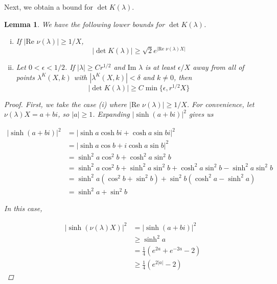 \documentclass[12pt]{article}
\newtheorem{lemma}{Lemma}
\begin{document}
Next, we obtain a bound for $\det K(\lambda)$. 


\begin{lemma}\label{detKlemma}
We have the following lower bounds for $\det K(\lambda)$.
\begin{enumerate}[(i)]
\item If $|\text{Re }\nu(\lambda)| \geq 1/X$, 
\begin{equation}\label{detKbound1}
|\det K(\lambda)| \geq \sqrt{2} e^{|\text{Re }\nu(\lambda)X|}
\end{equation}
\item Let $0 < \epsilon < 1/2$. If $|\lambda| \geq C r^{1/2}$ and $\text{Im }\lambda$ is at least $\epsilon/X$ away from all of points $\lambda^K(X,k)$ with $|\lambda^K(X,k)| < \delta$ and $k \neq 0$, then
\begin{equation}\label{detKbound2}
|\det K(\lambda)|\geq C \min\{ \epsilon, r^{1/2} X \}
\end{equation}
\end{enumerate}

\begin{proof}
First, we take the case (i) where $|\text{Re }\nu(\lambda)| \geq 1/X$. For convenience, let $\nu(\lambda)X = a + bi$, so $|a| \geq 1$. Expanding $|\sinh(a + b i)|^2$ gives us

\begin{align*}
|\sinh(a + b i)|^2 
&= |\sinh a \cosh b i + \cosh a \sin b i|^2 \\
&= |\sinh a \cos b + i \cosh a \sin b |^2 \\
&= \sinh^2 a \cos^2 b + \cosh^2 a \sin^2 b \\
&= \sinh^2 a \cos^2 b + \sinh^2 a \sin^2 b 
+ \cosh^2 a \sin^2 b - \sinh^2 a \sin^2 b \\
&= \sinh^2 a (\cos^2 b + \sin^2 b) 
+ \sin^2 b( \cosh^2 a - \sinh^2 a) \\
&= \sinh^2 a + \sin^2 b
\end{align*}

In this case,

\begin{align*}
|\sinh(\nu(\lambda) X)|^2 &= |\sinh(a + b i)|^2 \\
&\geq \sinh^2 a \\
&= \frac{1}{4}\left( e^{2a} + e^{-2a} - 2 \right) \\
&\geq \frac{1}{4}\left( e^{2|a|} - 2 \right)
\end{align*}


\end{proof}
\end{lemma}
\end{document}
